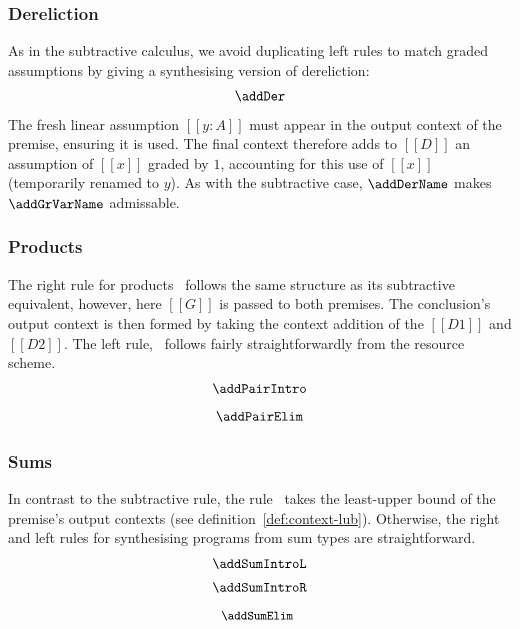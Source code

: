 \subsubsection{Dereliction}
As in the subtractive calculus,
we avoid duplicating left rules to
match graded assumptions by giving a synthesising version of dereliction:
\begin{align*}
  \addDer
  \end{align*}
%
The fresh linear assumption $[[ y : A ]]$ must
appear in the output context of the premise, ensuring it is used. The final
context therefore adds to $[[ D ]]$ an assumption of $[[x]]$ graded by
$1$, accounting for this use of $[[ x ]]$ (temporarily renamed to
$y$).
As with the subtractive case, $\addDerName$ makes $\addGrVarName$ admissable. 

\subsubsection{Products}
The right rule for products \addPairIntroName\ follows the same structure as its
subtractive equivalent, however, here $[[ G ]]$ is passed to both premises.
The conclusion's output context is then formed by taking the context addition of
the $[[ D1 ]]$ and $[[ D2 ]]$. The left rule, \addPairElimName\ follows fairly
straightforwardly from the resource scheme.
\begin{align*}
\begin{array}{c}
  \addPairIntro
\\[0.8em]
  \addPairElim
\end{array}
  \end{align*}

\subsubsection{Sums}
In contrast to the subtractive rule, the rule \addSumElimName\ takes the least-upper bound of
the premise's output contexts (see definition~\ref{def:context-lub}). Otherwise,
the right and left rules for synthesising programs from sum types are straightforward.
\begin{align*}
\begin{array}{c}
  \addSumIntroL
  \\[0.5em]
  \addSumIntroR
\\[0.8em]
{\small{\!\!\addSumElim}}
\end{array}
  \end{align*}

